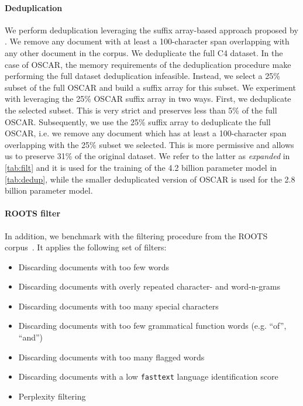 \documentclass{article}
\begin{document}
\paragraph{Deduplication} We perform deduplication leveraging the suffix array-based approach proposed by \citet{deduplicatinglee2021}. We remove any document with at least a 100-character span overlapping with any other document in the corpus. We deduplicate the full C4 dataset. In the case of OSCAR, the memory requirements of the deduplication procedure make performing the full dataset deduplication infeasible. Instead, we select a 25\% subset of the full OSCAR and build a suffix array for this subset. We experiment with leveraging the 25\% OSCAR suffix array in two ways. First, we deduplicate the selected subset. This is very strict and preserves less than 5\% of the full OSCAR. Subsequently, we use the 25\% suffix array to deduplicate the full OSCAR, i.e. we remove any document which has at least a 100-character span overlapping with the 25\% subset we selected. This is more permissive and allows us to preserve 31\% of the original dataset. We refer to the latter as \emph{expanded} in \autoref{tab:filt} and it is used for the training of the 4.2 billion parameter model in \autoref{tab:dedup}, while the smaller deduplicated version of OSCAR is used for the 2.8 billion parameter model.

\paragraph{ROOTS filter} In addition, we benchmark with the filtering procedure from the ROOTS corpus~\cite{laurencconbigscience}. It applies the following set of filters:
\begin{itemize}
    \item Discarding documents with too few words
    \item Discarding documents with overly repeated character- and word-n-grams
    \item Discarding documents with too many special characters
    \item Discarding documents with too few grammatical function words (e.g. ``of'', ``and'')
    \item Discarding documents with too many flagged words
    \item Discarding documents with a low \texttt{fasttext} language identification score
    \item Perplexity filtering
\end{itemize}
\end{document}
